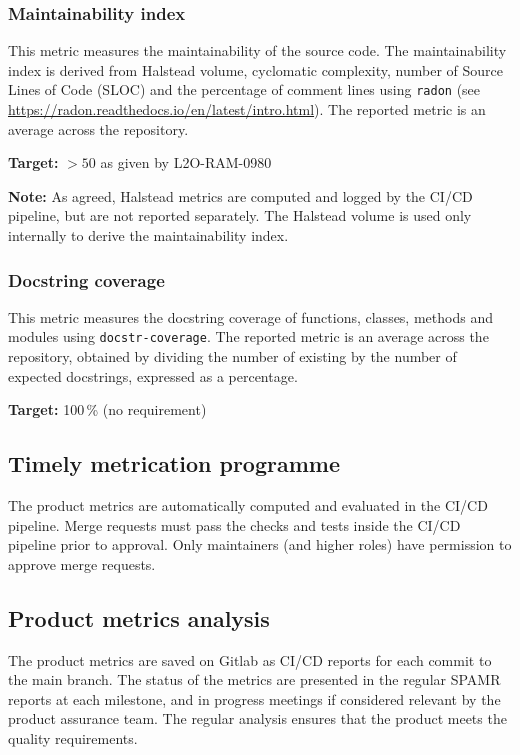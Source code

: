 
\subsubsection{Maintainability index}

This metric measures the maintainability of the source code. The maintainability index is derived from Halstead volume, cyclomatic complexity, number of Source Lines of Code (SLOC) and the percentage of comment lines using \texttt{radon} (see \url{https://radon.readthedocs.io/en/latest/intro.html}). The reported metric is an average across the repository.

\textbf{Target:} $> 50$ as given by L2O-RAM-0980

\textbf{Note:} As agreed, Halstead metrics are computed and logged by the CI/CD pipeline, but are not reported separately. The Halstead volume is used only internally to derive the maintainability index.


\subsubsection{Docstring coverage}

This metric measures the docstring coverage of functions, classes, methods and modules using \texttt{docstr-coverage}. The reported metric is an average across the repository, obtained by dividing the number of existing by the number of expected docstrings, expressed as a percentage.

\textbf{Target:} 100\,\% (no requirement)


\subsection{Timely metrication programme}
The product metrics are automatically computed and evaluated in the CI/CD pipeline. Merge requests must pass the checks and tests inside the CI/CD pipeline prior to approval. Only maintainers (and higher roles) have permission to approve merge requests.

\subsection{Product metrics analysis}
The product metrics are saved on Gitlab as CI/CD reports for each commit to the main branch. The status of the metrics are presented in the regular SPAMR reports at each milestone, and in progress meetings if considered relevant by the product assurance team. The regular analysis ensures that the product meets the quality requirements.

